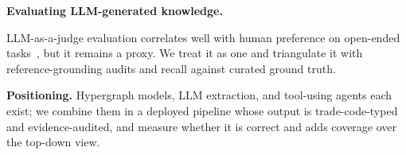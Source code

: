 \textbf{Evaluating LLM-generated knowledge.}
{\sloppy LLM-as-a-judge evaluation correlates well with human preference on open-ended tasks~\cite{zheng2023judging}, but it remains a proxy. We treat it as one and triangulate it with reference-grounding audits and recall against curated ground truth.\par}

\textbf{Positioning.}
Hypergraph models, LLM extraction, and tool-using agents each exist; we combine them in a deployed pipeline whose output is trade-code-typed and evidence-audited, and measure whether it is correct and adds coverage over the top-down view.

